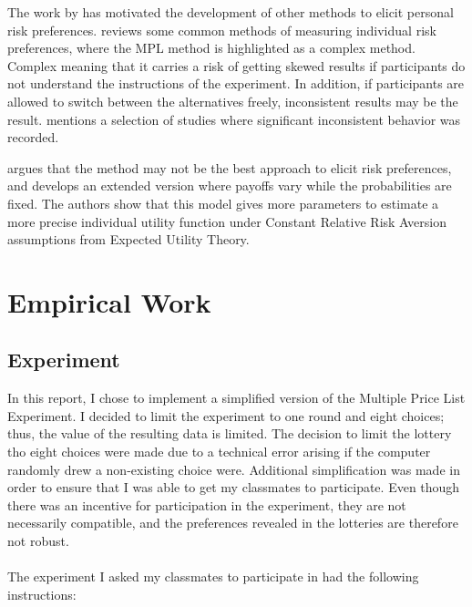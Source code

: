 \documentclass [12pt,a4paper,oneside]{article}
\begin{document}
The work by \textcite{holt_risk_2002} has motivated the development of other methods to elicit personal risk preferences. \textcite{charness_experimental_2013-1} reviews some common methods of measuring individual risk preferences, where the MPL method is highlighted as a complex method. Complex meaning that it carries a risk of getting skewed results if participants do not understand the instructions of the experiment. In addition, if participants are allowed to switch between the alternatives freely, inconsistent results may be the result. \textcite{charness_experimental_2013-1} mentions a selection of studies where significant inconsistent behavior was recorded. 

\textcite{drichoutis_what_2016-2} argues that the \textcite{holt_risk_2002} method may not be the best approach to elicit risk preferences, and develops an extended version where payoffs vary while the probabilities are fixed. The authors show that this model gives more parameters to estimate a more precise individual utility function under Constant Relative Risk Aversion assumptions from Expected Utility Theory. 





\section{Empirical Work}

\subsection{Experiment}
In this report, I chose to implement a simplified version of the \textcite{holt_risk_2002} Multiple Price List Experiment. I decided to limit the experiment to one round and eight choices; thus, the value of the resulting data is limited. The decision to limit the lottery tho eight choices were made due to a technical error arising if the computer randomly drew a non-existing choice were. 
Additional simplification was made in order to ensure that I was able to get my classmates to participate. 
Even though there was an incentive for participation in the experiment, they are not necessarily compatible, and the preferences revealed in the lotteries are therefore not robust. 

\paragraph{}
The experiment I asked my classmates to participate in had the following instructions:
\end{document}
